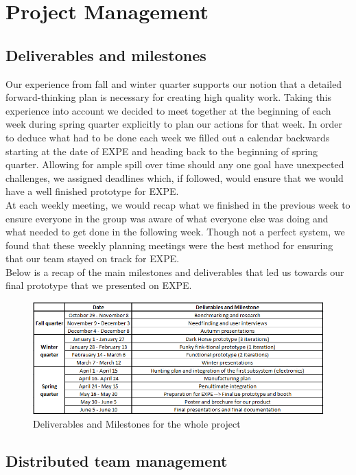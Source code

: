 \chapter{Project Management}
\label{Project_Management}

\section{Deliverables and milestones}

Our experience from fall and winter quarter supports our notion that a detailed forward-thinking plan is necessary for creating high quality work. Taking this experience into account we decided to meet together at the beginning of each week during spring quarter explicitly to plan our actions for that week. In order to deduce what had to be done each week we filled out a calendar backwards starting at the date of EXPE and heading back to the beginning of spring quarter. Allowing for ample spill over time should any one goal have unexpected challenges, we assigned deadlines which, if followed, would ensure that we would have a well finished prototype for EXPE.\\
At each weekly meeting, we would recap what we finished in the previous week to ensure everyone in the group was aware of what everyone else was doing and what needed to get done in the following week. Though not a perfect system, we found that these weekly planning meetings were the best method for ensuring that our team stayed on track for EXPE.\\
Below is a recap of the main milestones and deliverables that led us towards our final prototype that we presented on EXPE. 

\begin{figure}[h]
  \centering
     \includegraphics[scale=0.8]{images/planning.png}
   \caption{Deliverables and Milestones for the whole project}
  \label{fig:planning}
\end{figure}


\section{Distributed team management}


